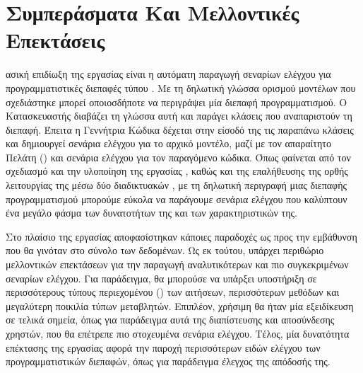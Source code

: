 \chapter{Συμπεράσματα Και Μελλοντικές Επεκτάσεις}
ασική επιδίωξη της εργασίας είναι η αυτόματη παραγωγή σεναρίων ελέγχου για προγραμματιστικές διεπαφές τύπου .
Με τη δηλωτική γλώσσα ορισμού  μοντέλων που σχεδιάστηκε
μπορεί οποιοσδήποτε να περιγράψει μία διεπαφή προγραμματισμού.
Ο Κατασκευαστής  διαβάζει τη γλώσσα αυτή
και παράγει  κλάσεις που αναπαριστούν τη διεπαφή.
Έπειτα η Γεννήτρια Κώδικα δέχεται στην είσοδό της τις παραπάνω κλάσεις
και δημιουργεί σενάρια ελέγχου για το αρχικό  μοντέλο,
μαζί με τον απαραίτητο Πελάτη () και σενάρια ελέγχου για τον παραγόμενο κώδικα. 
Όπως φαίνεται από τον σχεδιασμό και την υλοποίηση της εργασίας ,
καθώς και της επαλήθευσης της ορθής λειτουργίας της μέσω δύο διαδικτυακών ,
με τη δηλωτική περιγραφή μιας διεπαφής προγραμματισμού μπορούμε εύκολα να παράγουμε σενάρια ελέγχου 
που καλύπτουν ένα μεγάλο φάσμα των δυνατοτήτων της και των χαρακτηριστικών της.

Στο πλαίσιο της εργασίας αποφασίστηκαν κάποιες παραδοχές ως προς την εμβάθυνση που θα γινόταν στο σύνολο των δεδομένων.
Ως εκ τούτου, υπάρχει περιθώριο μελλοντικών επεκτάσεων για την παραγωγή αναλυτικότερων και πιο συγκεκριμένων σεναρίων ελέγχου.
Για παράδειγμα, θα μπορούσε να υπάρξει υποστήριξη σε περισσότερους τύπους περιεχομένου () των αιτήσεων,
περισσότερων  μεθόδων και μεγαλύτερη ποικιλία τύπων μεταβλητών.
Επιπλέον, χρήσιμη θα ήταν μία εξειδίκευση σε τελικά σημεία,
όπως για παράδειγμα αυτά της διαπίστευσης και αποσύνδεσης χρηστών,
που θα επέτρεπε πιο στοχευμένα σενάρια ελέγχου.
Τέλος, μία δυνατότητα επέκτασης της εργασίας αφορά την παροχή περισσότερων ειδών ελέγχου των προγραμματιστικών διεπαφών,
όπως για παράδειγμα έλεγχος της απόδοσής της.